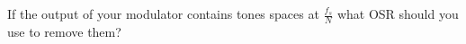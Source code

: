 \subsection{}

If the output of your modulator contains tones spaces at $\frac{f_{s}}{N}$ what OSR should you use to remove them?

